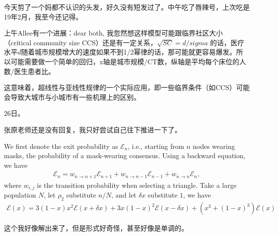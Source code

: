 今天剪了一个妈都不认识的头发，好久没有短发过了。中午吃了唇辣号，上次吃是19年2月，我至今还记得。

上午Allee有一个进展：dear both, 我忽然想这样模型可能跟临界社区大小（critical community size CCS）还是有一定关系，$\sqrt{SC} = d/sigma$ 的话，医疗水平$d$随着城市规模增大的速度如果不到1/2幂律的话，那可能就更容易爆发。所以可能需要做一个简单的回归，x轴是城市规模/CT数，纵轴是平均每个床位的人数/医生患者比。

这意味着，超线性与亚线性规律的一个实际应用，即一些临界条件（如CCS）可能会导致大城市与小城市有一些机理上的区别。

26日。

张原老师还是没有回复，我只好尝试自己往下推进一下了。

We first denote the exit probability as $\mathcal{E}_n$, i.e., starting from $n$ nodes wearing masks, the probability of a mask-wearing consensus. Using a backward equation, we have~\begin{align}
    \mathcal{E}_n = w_{n\to n+1}\mathcal{E}_{n+1} + w_{n\to n-1} \mathcal{E}_{n-1} + w_{n\to n} \mathcal{E}_{n},
\end{align} where $w_{i,j}$ is the transition probability when selecting a triangle. Take a large population $N$, let $\rho_2$ substitute $n/N$, and let $\delta x$ substitute $1$, we have~\begin{align}
    \mathcal{E}(x) = 3(1-x)x^2\mathcal{E}(x+\delta x) + 3x(1-x)^2 \mathcal{E}(x-\delta x) + (x^3 + (1-x)^3) \mathcal{E}(x)
\end{align}

这个我好像解出来了，但是形式好奇怪，甚至好像是单调的。

